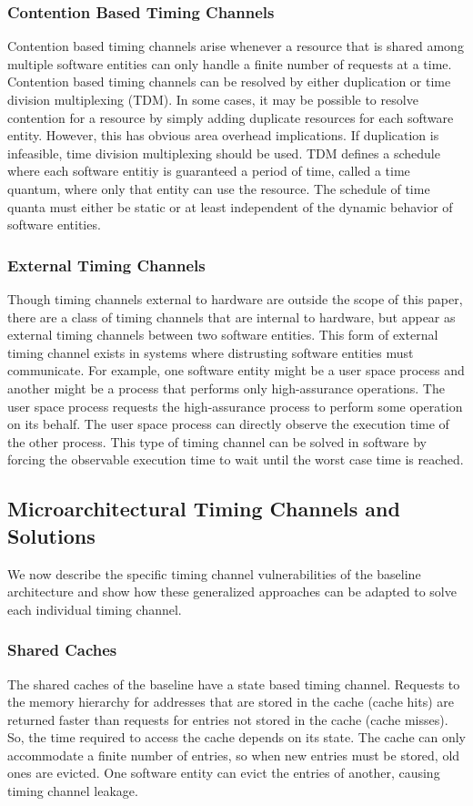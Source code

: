 \subsubsection{Contention Based Timing Channels}
Contention based timing channels arise whenever a resource that is shared among 
multiple software entities can only handle a finite number of requests at a 
time. Contention based timing channels can be resolved by either duplication or 
time division multiplexing (TDM). In some cases, it may be possible to resolve 
contention for a resource by simply adding duplicate resources for each 
software entity. However, this has obvious area overhead implications. If 
duplication is infeasible, time division multiplexing should be used. TDM 
defines a schedule where each software entitiy is guaranteed a period of time, 
called a time quantum, where only that entity can use the resource. The 
schedule of time quanta must either be static or at least independent of the 
dynamic behavior of software entities.

\subsubsection{External Timing Channels}
Though timing channels external to hardware are outside the scope of this 
paper, there are a class of timing channels that are internal to hardware, but 
appear as external timing channels between two software entities. This form of 
external timing channel exists in systems where distrusting software entities 
must communicate. For example, one software entity might be a user space 
process and another might be a process that performs only high-assurance 
operations. The user space process requests the high-assurance process to 
perform some operation on its behalf. The user space process can directly 
observe the execution time of the other process. This type of timing channel 
can be solved in software by forcing the observable execution time to wait 
until the worst case time is reached.

\subsection{Microarchitectural Timing Channels and Solutions}
We now describe the specific timing channel vulnerabilities of the baseline 
architecture and show how these generalized approaches can be adapted to solve 
each individual timing channel.
\subsubsection{Shared Caches}
The shared caches of the baseline have a state based timing channel. Requests 
to the memory hierarchy for addresses that are stored in the cache (cache hits) 
are returned faster than requests for entries not stored in the cache (cache 
misses). So, the time required to access the cache depends on its state. The 
cache can only accommodate a finite number of entries, so when new entries must 
be stored, old ones are evicted. One software entity can evict the entries of 
another, causing timing channel leakage.

